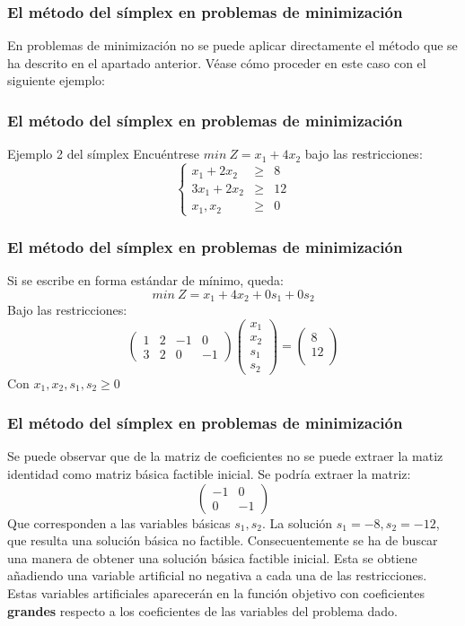 \documentclass{beamer}
\begin{document}
\begin{frame}
\frametitle{El m\'etodo del s\'implex en problemas de minimizaci\'on}
En problemas de minimizaci\'on no se puede aplicar directamente el m\'etodo que se ha descrito en el apartado anterior. V\'ease c\'omo proceder en este caso con el siguiente ejemplo:
\end{frame}


\begin{frame}
\frametitle{El m\'etodo del s\'implex en problemas de minimizaci\'on}
\begin{block}{Ejemplo 2 del s\'implex}
Encu\'entrese $min\ Z =x_1+4x_2$ bajo las restricciones:
\[\left\{\begin{array}{ccc}x_1+2x_2 & \geq & 8 \\3x_1+2x_2 & \geq & 12 \\x_1,x_2 & \geq & 0\end{array}\right.\]
\end{block}
\end{frame}


\begin{frame}
\frametitle{El m\'etodo del s\'implex en problemas de minimizaci\'on}
Si se escribe en forma est\'andar de m\'inimo, queda:
\[min\ Z = x_1+4x_2+0s_1+0s_2\]
Bajo las restricciones:
\[\left(\begin{array}{rrrr}1&2&-1&0 \\3&2&0&-1\end{array}\right)
\left(\begin{array}{c}x_1\\ x_2\\ s_1\\ s_2\end{array}\right) = 
\left(\begin{array}{c}8\\ 12 \\ \end{array}\right)\]
Con $x_1,x_2,s_1,s_2\geq 0$
\end{frame}

\begin{frame}
\frametitle{El m\'etodo del s\'implex en problemas de minimizaci\'on}
Se puede observar que de la matriz de coeficientes no se puede extraer la matiz identidad como matriz b\'asica factible inicial. Se podr\'ia extraer la matriz:
\[\left(\begin{array}{cc}-1&0 \\0&-1\end{array}\right)\]
Que corresponden a las variables b\'asicas $s_1,s_2$. La soluci\'on $s_1 = -8, s_2 = -12$, que resulta una soluci\'on b\'asica no factible. Consecuentemente se ha de buscar una manera de obtener una soluci\'on b\'asica factible inicial. Esta se obtiene a\~nadiendo una variable artificial no negativa a cada una de las restricciones. Estas variables artificiales aparecer\'an en la funci\'on objetivo con coeficientes \textbf{grandes} respecto a los coeficientes de las variables del problema dado. 
\end{frame}
\end{document}
